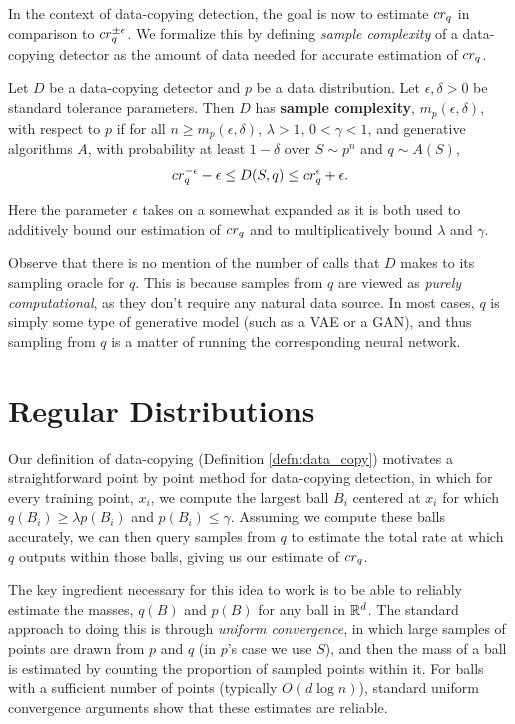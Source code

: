 In the context of data-copying detection, the goal is now to estimate $cr_q$ in comparison to $cr_q^{\pm \epsilon}$. We formalize this by defining \textit{sample complexity} of a data-copying detector as the amount of data needed for accurate estimation of $cr_q$. 

\begin{definition}\label{def:sample_complexity}
Let $D$ be a data-copying detector and $p$ be a data distribution. Let $\epsilon, \delta > 0$ be standard tolerance parameters. Then $D$ has \textbf{sample complexity}, $m_p(\epsilon, \delta)$, with respect to $p$ if for all $n \geq m_p(\epsilon, \delta)$, $\lambda >1$, $0 < \gamma < 1$, and generative algorithms $A$, with probability at least $1 - \delta$ over $S \sim p^n$ and $q \sim A(S)$, $$cr_q^{-\epsilon} - \epsilon \leq D(S, q) \leq cr_q^{\epsilon} + \epsilon.$$
\end{definition}

Here the parameter $\epsilon$ takes on a somewhat expanded as it is both used to additively bound our estimation of $cr_q$ and to multiplicatively bound $\lambda$ and $\gamma$.

Observe that there is no mention of the number of calls that $D$ makes to its sampling oracle for $q$. This is because samples from $q$ are viewed as \textit{purely computational}, as they don't require any natural data source. In most cases, $q$ is simply some type of generative model (such as a VAE or a GAN), and thus sampling from $q$ is a matter of running the corresponding neural network.

\section{Regular Distributions}\label{sec:regular_dist}

Our definition of data-copying (Definition \ref{defn:data_copy}) motivates a straightforward point by point method for data-copying detection, in which for every training point, $x_i$, we compute the largest ball $B_i$ centered at $x_i$ for which $q(B_i) \geq \lambda p(B_i)$ and $p(B_i) \leq \gamma$. Assuming we compute these balls accurately, we can then query samples from $q$ to estimate the total rate at which $q$ outputs within those balls, giving us our estimate of $cr_q$.

The key ingredient necessary for this idea to work is to be able to reliably estimate the masses, $q(B)$ and $p(B)$ for any ball in $\mathbb{R}^d$. The standard approach to doing this is through \textit{uniform convergence}, in which large samples of points are drawn from $p$ and $q$ (in $p$'s case we use $S$), and then the mass of a ball is estimated by counting the proportion of sampled points within it. For balls with a sufficient number of points (typically $O( d\log n)$), standard uniform convergence arguments show that these estimates are reliable.

